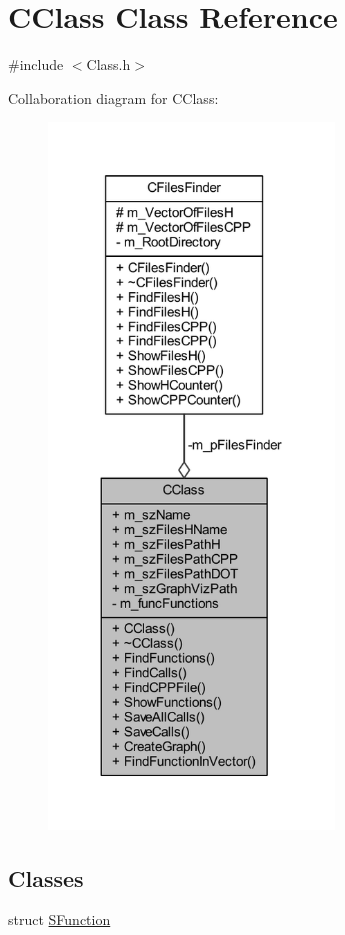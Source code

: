 \hypertarget{class_c_class}{\section{C\+Class Class Reference}
\label{class_c_class}
}


{\ttfamily \#include $<$Class.\+h$>$}



Collaboration diagram for C\+Class\+:
\nopagebreak
\begin{figure}[H]
\begin{center}
\leavevmode
\includegraphics[width=215pt]{class_c_class__coll__graph}
\end{center}
\end{figure}
\subsection*{Classes}
\begin{DoxyCompactItemize}
\item 
struct \hyperlink{struct_c_class_1_1_s_function}{S\+Function}
\end{DoxyCompactItemize}
